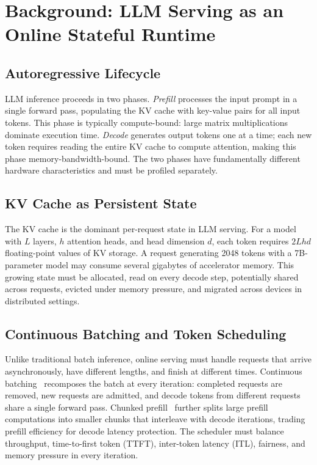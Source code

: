 \documentclass[conference]{IEEEtran}
\begin{document}
\section{Background: LLM Serving as an Online Stateful Runtime}
\label{sec:background}

\subsection{Autoregressive Lifecycle}

LLM inference proceeds in two phases. \emph{Prefill} processes the input prompt
in a single forward pass, populating the KV cache with key-value pairs for all
input tokens. This phase is typically compute-bound: large matrix
multiplications dominate execution time. \emph{Decode} generates output tokens
one at a time; each new token requires reading the entire KV cache to compute
attention, making this phase memory-bandwidth-bound. The two phases have
fundamentally different hardware characteristics and must be profiled
separately.

\subsection{KV Cache as Persistent State}

The KV cache is the dominant per-request state in LLM serving. For a model with
$L$ layers, $h$ attention heads, and head dimension $d$, each token requires
$2Lhd$ floating-point values of KV storage. A request generating 2048 tokens
with a 7B-parameter model may consume several gigabytes of accelerator memory.
This growing state must be allocated, read on every decode step, potentially
shared across requests, evicted under memory pressure, and migrated across
devices in distributed settings.

\subsection{Continuous Batching and Token Scheduling}

Unlike traditional batch inference, online serving must handle requests that
arrive asynchronously, have different lengths, and finish at different times.
Continuous batching~\cite{orca} recomposes the batch at every iteration:
completed requests are removed, new requests are admitted, and decode tokens
from different requests share a single forward pass. Chunked
prefill~\cite{sarathi} further splits large prefill computations into smaller
chunks that interleave with decode iterations, trading prefill efficiency for
decode latency protection. The scheduler must balance throughput, time-to-first
token (TTFT), inter-token latency (ITL), fairness, and memory pressure in every
iteration.
\end{document}
